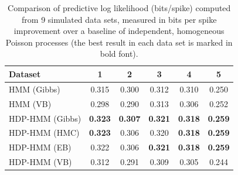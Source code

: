\begin{table}
  \centering
  \caption[Comparison of predictive log likelihood on synthetic
    data]{Comparison of predictive log likelihood (bits/spike)
    computed from 9 simulated data sets, measured in bits per spike
    improvement over a baseline of independent, homogeneous Poisson
    processes (the best result in each data set is marked in bold
    font). }
  \begin{tabular}{l|ccccc}
    Dataset & 1 & 2 & 3 & 4 & 5 \\
    \hline
    HMM (Gibbs) & 0.315 & 0.300 & 0.312 & 0.310 & 0.250 \\
    HMM (VB)  & 0.298 & 0.290 & 0.313 & 0.306 & 0.252 \\ 
    HDP-HMM (Gibbs) & \bf{0.323} & \bf{0.307} & \bf{0.321} & \bf{0.318} & \bf{0.259} \\
    HDP-HMM (HMC) & \bf{0.323} & 0.306 & 0.320 & \bf{0.318} & \bf{0.259} \\
    HDP-HMM (EB)  & 0.322 & 0.306 & \bf{0.321} & \bf{0.318} & \bf{0.259} \\
    HDP-HMM (VB)  & 0.312 & 0.291 & 0.309 & 0.305 & 0.244 \\
    \hline
  \end{tabular}
  \label{tab:synth_pll}
\end{table}

